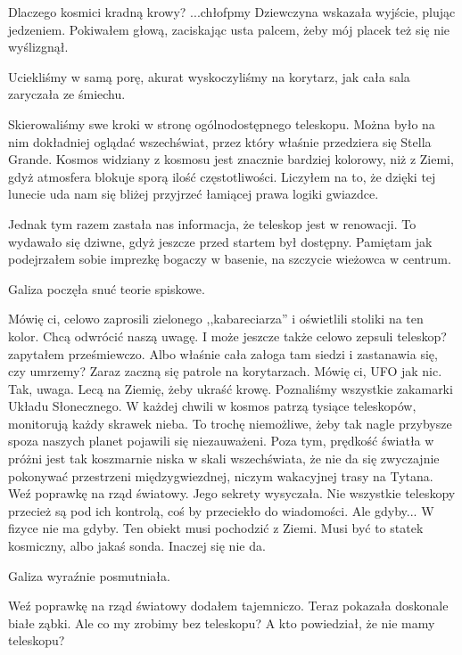 \begin{dialogue}
	\ds{} Dlaczego kosmici kradną krowy?
	\ds{} ...chłofpmy \dm{} Dziewczyna wskazała wyjście, plując jedzeniem. Pokiwałem głową, zaciskając usta palcem, żeby mój placek też się nie wyślizgnął.
\end{dialogue}

Uciekliśmy w samą porę, akurat wyskoczyliśmy na korytarz, jak cała sala zaryczała ze śmiechu.

Skierowaliśmy swe kroki w stronę ogólnodostępnego teleskopu.
Można było na nim dokładniej oglądać wszechświat, przez który właśnie przedziera się Stella Grande.
Kosmos widziany z kosmosu jest znacznie bardziej kolorowy, niż z Ziemi, gdyż atmosfera blokuje sporą ilość częstotliwości.
Liczyłem na to, że dzięki tej lunecie uda nam się bliżej przyjrzeć łamiącej prawa logiki gwiazdce.

Jednak tym razem zastała nas informacja, że teleskop jest w renowacji.
To wydawało się dziwne, gdyż jeszcze przed startem był dostępny. Pamiętam jak podejrzałem sobie imprezkę bogaczy w basenie, na szczycie wieżowca w centrum.

Galiza poczęła snuć teorie spiskowe.
\begin{dialogue}
	\ds{} Mówię ci, celowo zaprosili zielonego ,,kabareciarza'' i oświetlili stoliki na ten kolor. Chcą odwrócić naszą uwagę.
	\ds{} I może jeszcze także celowo zepsuli teleskop? \dm{} zapytałem prześmiewczo.
	\ds{} Albo właśnie cała załoga tam siedzi i zastanawia się, czy umrzemy? Zaraz zaczną się patrole na korytarzach. Mówię ci, UFO jak nic.
	\ds{} Tak, uwaga. Lecą na Ziemię, żeby ukraść krowę. Poznaliśmy wszystkie zakamarki Układu Słonecznego. W każdej chwili w kosmos patrzą tysiące teleskopów, monitorują każdy skrawek nieba. To trochę niemożliwe, żeby tak nagle przybysze spoza naszych planet pojawili się niezauważeni. Poza tym, prędkość światła w próżni jest tak koszmarnie niska w skali wszechświata, że nie da się zwyczajnie pokonywać przestrzeni międzygwiezdnej, niczym wakacyjnej trasy na Tytana.
	\ds{} Weź poprawkę na rząd światowy. Jego sekrety \dm{} wysyczała.
	\ds{} Nie wszystkie teleskopy przecież są pod ich kontrolą, coś by przeciekło do wiadomości.
	\ds{} Ale gdyby...
	\ds{} W fizyce nie ma gdyby. Ten obiekt musi pochodzić z Ziemi. Musi być to statek kosmiczny, albo jakaś sonda. Inaczej się nie da.
\end{dialogue}

Galiza wyraźnie posmutniała.

\begin{dialogue}
	\ds{} Weź poprawkę na rząd światowy \dm{} dodałem tajemniczo. Teraz pokazała doskonale białe ząbki.
	\ds{} Ale co my zrobimy bez teleskopu?
	\ds{} A kto powiedział, że nie mamy teleskopu?
\end{dialogue}

